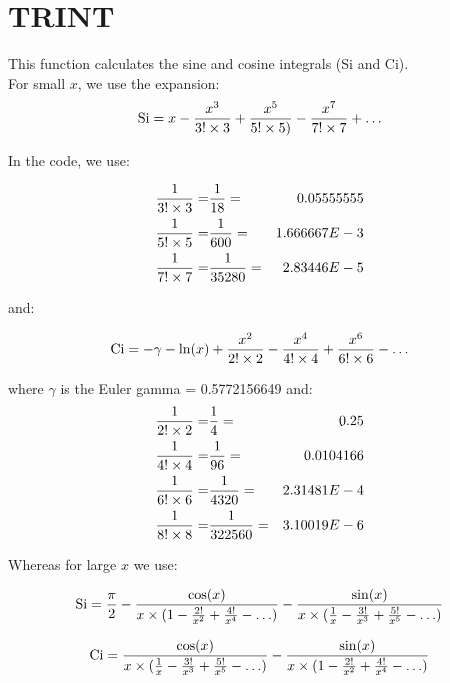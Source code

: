 \section{TRINT}
\label{sect:trint}

\noindent This function calculates the sine and cosine integrals (Si and
Ci).\\

\noindent For small $x$, we use the expansion:\\

\begin{equation}
\mathrm{Si} = x - {x^3 \over 3! \times 3} + {x^5 \over 5! \times 5)} -
{x^7 \over 7! \times 7} + {\ldots}
\end{equation}

\noindent In the code, we use:

\begin{eqnarray*}
{1 \over 3! \times 3} =& {1 \over 18}    =& 0.05555555\\
{1 \over 5! \times 5} =& {1 \over 600}   =& 1.666667E-3\\
{1 \over 7! \times 7} =& {1 \over 35280} =& 2.83446E-5
\end{eqnarray*}

\noindent and:

\begin{equation}
\mathrm{Ci} = -\gamma - \ln(x) + {x^2 \over 2! \times 2} -
{x^4 \over 4! \times 4} + {x^6 \over 6! \times 6} - \ldots
\end{equation}

\noindent where $\gamma$ is the Euler gamma = 0.5772156649 and:\\

\begin{eqnarray*}
{1 \over 2! \times 2} =& {1 \over 4}      =& 0.25\\
{1 \over 4! \times 4} =& {1 \over 96}     =& 0.0104166\\
{1 \over 6! \times 6} =& {1 \over 4320}   =& 2.31481E-4\\
{1 \over 8! \times 8} =& {1 \over 322560} =& 3.10019E-6
\end{eqnarray*}

\noindent Whereas for large $x$ we use:

\begin{equation}
\mathrm{Si} = {\pi \over 2} - 
{\cos(x) \over {x \times (1 - {2! \over x^2} + {4! \over x^4} - \ldots)}}
- {\sin(x) \over {x \times ({1 \over x} - {3! \over x^3} + {5! \over x^5} -
\ldots)}}
\end{equation}

\begin{equation}
\mathrm{Ci} = {\cos(x) \over x \times ({1 \over x} - {3! \over x^3} + {5! \over x^5} - \ldots)}
- {\sin(x) \over x \times (1 - {2! \over x^2} + {4! \over x^4} - \ldots)}
\end{equation}
